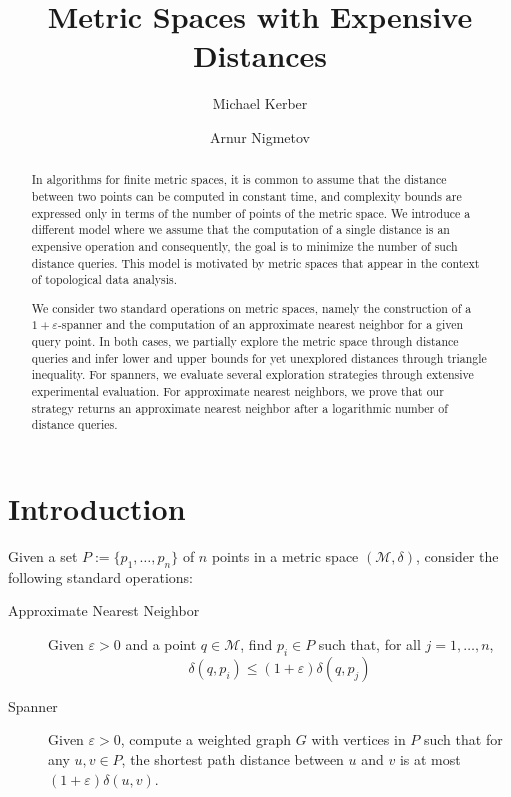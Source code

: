 \documentclass[a4paper,USenglish]{socg-lipics-v2018}
\title{Metric Spaces with Expensive Distances}
\author{Michael Kerber}{TU Graz}{kerber@tugraz.at}{https://orcid.org/0000-0002-8030-9299}{Supported by Austrian Science Fund (FWF) grant number P 29984-N35}
\author{Arnur Nigmetov}{TU Graz}{nigmetov@tugraz.at}{}{}
\newcommand{\eps}{\varepsilon}
\newcommand{\metricspace}{\mathcal{M}}
\newcommand{\pointset}{P}
\newcommand{\dist}{\delta}
\begin{document}
\maketitle

\begin{abstract}
In algorithms for finite metric spaces, it is common
to assume that the distance between two points
can be computed in constant time, and complexity
bounds are expressed only in terms of the number
of points of the metric space.
We introduce a different model where we assume
that the computation of a single distance is
an expensive operation and consequently, the goal is
to minimize the number of such distance queries.
This model is motivated by metric spaces
that appear in the context of topological data analysis.

We consider two standard operations on metric spaces,
namely the construction of a $1+\eps$-spanner
and the computation of an approximate nearest
neighbor for a given query point.
In both cases, we partially explore the metric space
through distance queries and infer lower and upper bounds
for yet unexplored distances through triangle inequality.
For spanners, we evaluate several exploration strategies
through extensive experimental evaluation.
For approximate nearest neighbors, we prove that our
strategy returns an approximate nearest neighbor
after a logarithmic number of distance queries.
\end{abstract}


\section{Introduction}

Given a set $\pointset:=\{p_1,\ldots,p_n\}$ of $n$ points
in a metric space $(\metricspace,\dist)$, 
consider the following standard operations:

\begin{description}
\item[Approximate Nearest Neighbor] Given $\eps>0$ and a point $q\in\metricspace$,
find $p_i\in\pointset$ such that, for all $j=1,\ldots,n$,
\[\dist(q,p_i)\leq(1+\eps)\dist(q,p_j)\]

\item[Spanner] Given $\eps>0$, compute a weighted graph $G$ with vertices in $\pointset$
such that for any $u,v\in\pointset$, the shortest path distance between $u$ and $v$
is at most $(1+\eps)\dist(u,v)$.
\end{description}
\end{document}
